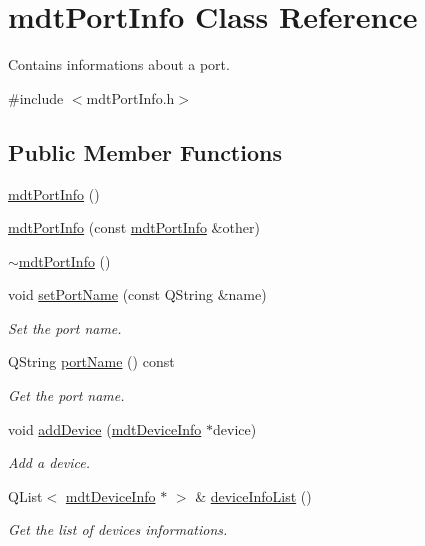 \hypertarget{classmdt_port_info}{\section{mdt\-Port\-Info Class Reference}
\label{classmdt_port_info}
}


Contains informations about a port.  




{\ttfamily \#include $<$mdt\-Port\-Info.\-h$>$}

\subsection*{Public Member Functions}
\begin{DoxyCompactItemize}
\item 
\hyperlink{classmdt_port_info_a85cb5a8f2b059e01b347f58978d7747c}{mdt\-Port\-Info} ()
\item 
\hyperlink{classmdt_port_info_a77029d8f37cfb8efcc7c427df3db0f66}{mdt\-Port\-Info} (const \hyperlink{classmdt_port_info}{mdt\-Port\-Info} \&other)
\item 
\hyperlink{classmdt_port_info_a28266e2476fae4a24ea8a7f9353e1532}{$\sim$mdt\-Port\-Info} ()
\item 
void \hyperlink{classmdt_port_info_a5de494f20c68f61332761909756f5a33}{set\-Port\-Name} (const Q\-String \&name)
\begin{DoxyCompactList}\small\item\em Set the port name. \end{DoxyCompactList}\item 
Q\-String \hyperlink{classmdt_port_info_ad456aac33dccc9b0583ed8aa4796cdf0}{port\-Name} () const 
\begin{DoxyCompactList}\small\item\em Get the port name. \end{DoxyCompactList}\item 
void \hyperlink{classmdt_port_info_a2a8d6603b7e134ffd9e11900ece88a61}{add\-Device} (\hyperlink{classmdt_device_info}{mdt\-Device\-Info} $\ast$device)
\begin{DoxyCompactList}\small\item\em Add a device. \end{DoxyCompactList}\item 
Q\-List$<$ \hyperlink{classmdt_device_info}{mdt\-Device\-Info} $\ast$ $>$ \& \hyperlink{classmdt_port_info_a22013ea9e2de1d12cef673a2452d5b80}{device\-Info\-List} ()
\begin{DoxyCompactList}\small\item\em Get the list of devices informations. \end{DoxyCompactList}\item 

\end{DoxyCompactItemize}
